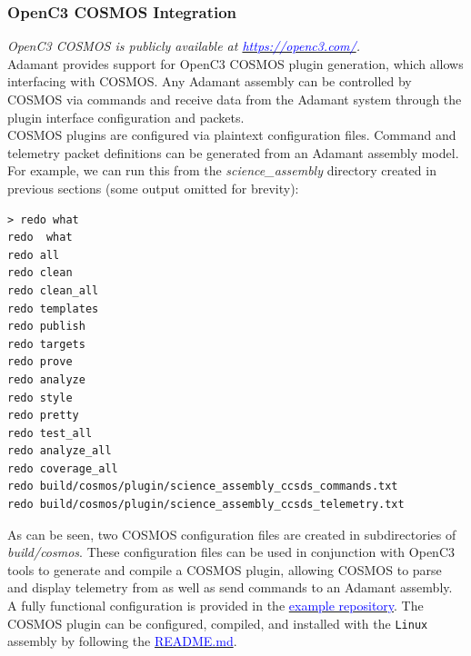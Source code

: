 \subsubsection{OpenC3 COSMOS Integration}

\textit{OpenC3 COSMOS is publicly available at \href{https://openc3.com/}{\textcolor{blue}{https://openc3.com/}}.} \\

Adamant provides support for OpenC3 COSMOS plugin generation, which allows interfacing with COSMOS. Any Adamant assembly can be controlled by COSMOS via commands and receive data from the Adamant system through the plugin interface configuration and packets. \\

COSMOS plugins are configured via plaintext configuration files. Command and telemetry packet definitions can be generated from an Adamant assembly model. For example, we can run this from the \textit{science\_assembly} directory created in previous sections (some output omitted for brevity):

\vspace{5mm} %
\begin{verbatim}
> redo what
redo  what
redo all
redo clean
redo clean_all
redo templates
redo publish
redo targets
redo prove
redo analyze
redo style
redo pretty
redo test_all
redo analyze_all
redo coverage_all
redo build/cosmos/plugin/science_assembly_ccsds_commands.txt
redo build/cosmos/plugin/science_assembly_ccsds_telemetry.txt
\end{verbatim}
\vspace{5mm} %

As can be seen, two COSMOS configuration files are created in subdirectories of \textit{build/cosmos}. These configuration files can be used in conjunction with OpenC3 tools to generate and compile a COSMOS plugin, allowing COSMOS to parse and display telemetry from as well as send commands to an Adamant assembly. \\

A fully functional configuration is provided in the \href{https://github.com/lasp/adamant_example/tree/main/src/assembly/linux/main/}{\textcolor{blue}{example repository}}. The COSMOS plugin can be configured, compiled, and installed with the \texttt{Linux} assembly by following the \href{https://github.com/lasp/adamant_example/tree/main/src/assembly/linux/main/README.md}{\textcolor{blue}{README.md}}. \\

